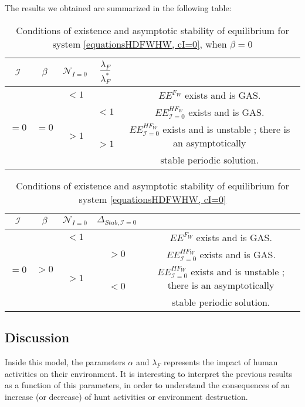 \documentclass{article}
\newcommand{\lfw}{\lambda_{F}}
\newcommand{\lfw}{\lambda_{F}}
\newcommand{\cI}{\mathcal{I}}
\begin{document}
The results we obtained are summarized in the following table:
\begin{table}[!ht]
\centering
\def\arraystretch{2}
\begin{tabular}{c|c|c|c|c}
$\cI$ &$\beta$ & $\mathcal{N}_{I =0}$ &  $\dfrac{\lfw}{  \lfw ^*}$ & \\
\hline
\multirow{4}{*}{$=0$}&\multirow{4}{*}{$=0$} & $ < 1$ & &$EE^{F_W}$ exists and is GAS.  \\
\cline{3-5}
 & & \multirow{3}{*}{$> 1$} & $ <1$ &$EE^{HF_W}_{\cI=0}$ exists and is GAS.\\
 \cline{4-5}
 & & &\multirow{2}{*}{$ > 1$} & $EE^{HF_W}_{\cI=0}$ exists and is unstable ; there is an asymptotically \\
& & & &  stable periodic solution.
\end{tabular}
\caption{\centering Conditions of existence and asymptotic stability of equilibrium for system \eqref{equationsHDFWHW, cI=0}, when $\beta = 0$}
\end{table}


\begin{table}[!ht]
\centering
\def\arraystretch{2}
\begin{tabular}{c|c|c|c|c}
$\cI$ &$\beta$ & $\mathcal{N}_{I =0}$ &  $\Delta_{Stab, \cI =0}$ & \\
\hline
\multirow{4}{*}{$=0$}&\multirow{4}{*}{$>0$} & $ < 1$ & &$EE^{F_W}$ exists and is GAS.  \\
\cline{3-5}
 & & \multirow{3}{*}{$> 1$} & $ >0$ &$EE^{HF_W}_{\cI=0}$ exists and is GAS.\\
 \cline{4-5}
 & & &\multirow{2}{*}{$ <0 $} & $EE^{HF_W}_{\cI=0}$ exists and is unstable ; there is an asymptotically \\
& & & &  stable periodic solution.
\end{tabular}
\caption{\centering Conditions of existence and asymptotic stability of equilibrium for system \eqref{equationsHDFWHW, cI=0}}
\end{table}

\subsection{Discussion}
Inside this model, the parameters $\alpha$ and $\lfw$ represents the impact of human activities on their environment. It is interesting to interpret the previous results as a function of this parameters, in order to understand the consequences of an increase (or decrease) of hunt activities or environment destruction.
\end{document}
